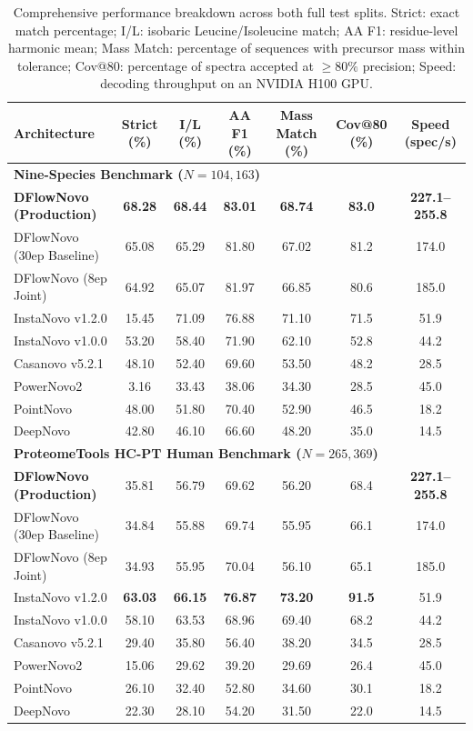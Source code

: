 \begin{table}[!ht]
\centering
\small
\setlength{\tabcolsep}{4.0pt}
\begin{tabular}{lcccccc}
\toprule
\textbf{Architecture} & \textbf{Strict (\%)} & \textbf{I/L (\%)} & \textbf{AA F1 (\%)} & \textbf{Mass Match (\%)} & \textbf{Cov@80 (\%)} & \textbf{Speed (spec/s)} \\
\midrule
\multicolumn{7}{l}{\textbf{Nine-Species Benchmark ($N = 104,163$)}} \\
\textbf{DFlowNovo (Production)} & \textbf{68.28} & \textbf{68.44} & \textbf{83.01} & \textbf{68.74} & \textbf{83.0} & \textbf{227.1--255.8} \\
DFlowNovo (30ep Baseline) & 65.08 & 65.29 & 81.80 & 67.02 & 81.2 & 174.0 \\
DFlowNovo (8ep Joint) & 64.92 & 65.07 & 81.97 & 66.85 & 80.6 & 185.0 \\
InstaNovo v1.2.0 & 15.45 & 71.09 & 76.88 & 71.10 & 71.5 & 51.9 \\
InstaNovo v1.0.0 & 53.20 & 58.40 & 71.90 & 62.10 & 52.8 & 44.2 \\
Casanovo v5.2.1 & 48.10 & 52.40 & 69.60 & 53.50 & 48.2 & 28.5 \\
PowerNovo2 & 3.16 & 33.43 & 38.06 & 34.30 & 28.5 & 45.0 \\
PointNovo & 48.00 & 51.80 & 70.40 & 52.90 & 46.5 & 18.2 \\
DeepNovo & 42.80 & 46.10 & 66.60 & 48.20 & 35.0 & 14.5 \\
\midrule
\multicolumn{7}{l}{\textbf{ProteomeTools HC-PT Human Benchmark ($N = 265,369$)}} \\
\textbf{DFlowNovo (Production)} & 35.81 & 56.79 & 69.62 & 56.20 & 68.4 & \textbf{227.1--255.8} \\
DFlowNovo (30ep Baseline) & 34.84 & 55.88 & 69.74 & 55.95 & 66.1 & 174.0 \\
DFlowNovo (8ep Joint) & 34.93 & 55.95 & 70.04 & 56.10 & 65.1 & 185.0 \\
InstaNovo v1.2.0 & \textbf{63.03} & \textbf{66.15} & \textbf{76.87} & \textbf{73.20} & \textbf{91.5} & 51.9 \\
InstaNovo v1.0.0 & 58.10 & 63.53 & 68.96 & 69.40 & 68.2 & 44.2 \\
Casanovo v5.2.1 & 29.40 & 35.80 & 56.40 & 38.20 & 34.5 & 28.5 \\
PowerNovo2 & 15.06 & 29.62 & 39.20 & 29.69 & 26.4 & 45.0 \\
PointNovo & 26.10 & 32.40 & 52.80 & 34.60 & 30.1 & 18.2 \\
DeepNovo & 22.30 & 28.10 & 54.20 & 31.50 & 22.0 & 14.5 \\
\bottomrule
\end{tabular}
\caption{Comprehensive performance breakdown across both full test splits. Strict: exact match percentage; I/L: isobaric Leucine/Isoleucine match; AA F1: residue-level harmonic mean; Mass Match: percentage of sequences with precursor mass within tolerance; Cov@80: percentage of spectra accepted at $\ge 80\%$ precision; Speed: decoding throughput on an NVIDIA H100 GPU.}
\label{tab:extended_benchmark_metrics}
\end{table}

